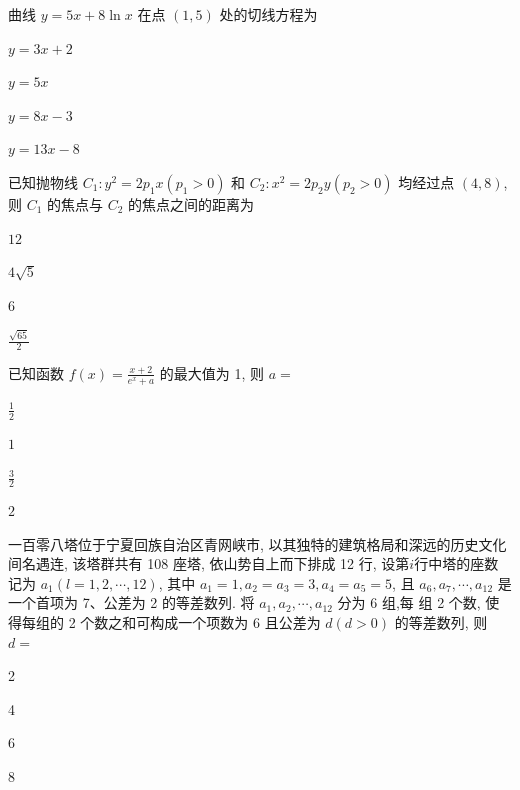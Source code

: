 \documentclass{exam-zh}
\begin{document}
\begin{question}%
  曲线 $y=5x+8\ln x$ 在点 $(1,5)$ 处的切线方程为 \paren
  \begin{choices}
  \item $y=3x+2$
  \item $y=5x$
  \item $y=8x-3$
  \item $y=13x-8$
  \end{choices}
\end{question}

\begin{question}%
  已知抛物线 $C_{1}: y^{2}=2 p_{1} x\left(p_{1}>0\right)$ 和
  $C_{2}:x^2=2 p_{2} y\left(p_{2}>0\right)$
  均经过点 $(4,8)$, 则 $C_{1}$ 的焦点与 $C_{2}$ 的焦点之间的距离为 \paren
  \begin{choices}
  \item $12$
  \item $4\sqrt{5}$
  \item $6$
  \item $\frac{\sqrt{65}}{2}$
  \end{choices}
\end{question}

\begin{question}%
  已知函数 $f(x)=\frac{x+2}{e^{x}+a}$ 的最大值为 1, 则 $a=$\paren
  \begin{choices}
  \item $\frac{1}{2} $
  \item $1$
  \item $\frac{3}{2} $
  \item $2$
  \end{choices}
\end{question}

\begin{question}%
  一百零八塔位于宁夏回族自治区青网峡市, 以其独特的建筑格局和深远的历史文化间名遇连,
  该塔群共有 108 座塔, 依山势自上而下排成 12 行,
  设第$i$行中塔的座数记为 $a_{1}(l=1,2,\cdots,12)$,
  其中 $a_{1}=1, a_{2}=a_{3}=3,a_{4}=a_{5}=5$,
  且 $a_{6},a_{7},\cdots,a_{12}$ 是一个首项为 7、公差为 2 的等差数列.
  将 $a_{1}, a_{2}, \cdots, a_{12}$ 分为 6 组,每 组 2 个数,
  使得每组的 2 个数之和可构成一个项数为 6 且公差为 $d(d>0)$ 的等差数列, 则 $d=$\paren
  \begin{choices}
  \item 2
  \item 4
  \item 6
  \item 8
  \end{choices}
\end{question}
\end{document}
